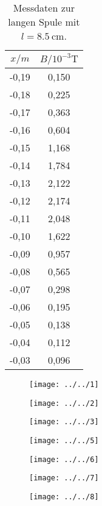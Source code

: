 \begin{table}[htbp]
	\centering
	\caption{Messdaten zur langen Spule mit $l = \SI{8,5}{\cm}$.}
	\label{tab:KurzeSpule}
	\begin{tabular}{c c}
		\toprule
		$x / \si{m} $ & $ B / 10^{-3} \si{\tesla}$ \\
		\midrule
		-0,19 & 0,150 \\
		-0,18 & 0,225 \\
		-0,17 & 0,363 \\
		-0,16 & 0,604 \\
		-0,15 & 1,168 \\
		-0,14 & 1,784 \\
		-0,13 & 2,122 \\
		-0,12 & 2,174 \\
		-0,11 & 2,048 \\
		-0,10 & 1,622 \\
		-0,09 & 0,957 \\
		-0,08 & 0,565 \\
		-0,07 & 0,298 \\
		-0,06 & 0,195 \\
		-0,05 & 0,138 \\
		-0,04 & 0,112 \\
		-0,03 & 0,096 \\
		\bottomrule
	\end{tabular}
\end{table}

\begin{figure}[h!]
	\centering
	\texttt{[image: ../../1]}
	\caption{}
	\label{fig:1}
\end{figure}
\begin{figure}[h!]
	\centering
	\texttt{[image: ../../2]}
	\caption{}
	\label{fig:2}
\end{figure}
\begin{figure}[h!]
	\centering
	\texttt{[image: ../../3]}
	\caption{}
	\label{fig:3}
\end{figure}
\begin{figure}[h!]
	\centering
	\texttt{[image: ../../5]}
	\caption{}
	\label{fig:5}
\end{figure}
\begin{figure}[h!]
	\centering
	\texttt{[image: ../../6]}
	\caption{}
	\label{fig:6}
\end{figure}
\begin{figure}[h!]
	\centering
	\texttt{[image: ../../7]}
	\caption{}
	\label{fig:7}
\end{figure}
\begin{figure}[h!]
	\centering
	\texttt{[image: ../../8]}
	\caption{}
	\label{fig:8}
\end{figure}

